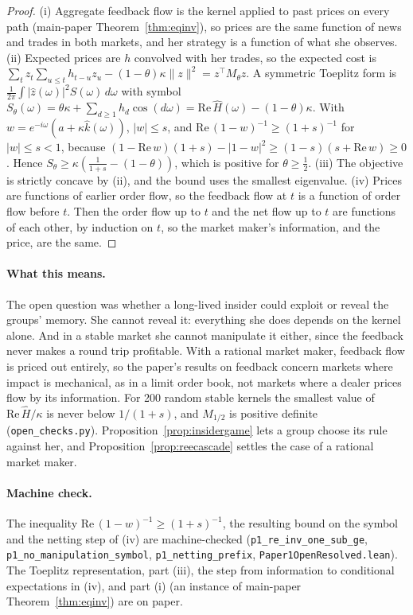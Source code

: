 \documentclass[12pt]{article}
\theoremstyle{definition}
\theoremstyle{remark}
\begin{document}
\begin{proof}
(i) Aggregate feedback flow is the kernel applied to past prices on every path (main-paper Theorem~\ref{thm:eqinv}), so prices are the same function of news and trades in both markets, and her strategy is a function of what she observes. (ii) Expected prices are $h$ convolved with her trades, so the expected cost is $\sum_tz_t\sum_{u\le t}h_{t-u}z_u-(1-\theta)\kappa\|z\|^2=z^\top M_\theta z$. A symmetric Toeplitz form is $\frac1{2\pi}\int|\hat z(\omega)|^2S(\omega)\,d\omega$ with symbol $S_\theta(\omega)=\theta\kappa+\sum_{d\ge1}h_d\cos(d\omega)=\mathrm{Re}\,\hat H(\omega)-(1-\theta)\kappa$. With $w=e^{-i\omega}(a+\kappa\hat k(\omega))$, $|w|\le s$, and $\mathrm{Re}\,(1-w)^{-1}\ge(1+s)^{-1}$ for $|w|\le s<1$, because $(1-\mathrm{Re}\,w)(1+s)-|1-w|^2\ge(1-s)(s+\mathrm{Re}\,w)\ge0$. Hence $S_\theta\ge\kappa(\frac1{1+s}-(1-\theta))$, which is positive for $\theta\ge\frac12$. (iii) The objective is strictly concave by (ii), and the bound uses the smallest eigenvalue. (iv) Prices are functions of earlier order flow, so the feedback flow at $t$ is a function of order flow before $t$. Then the order flow up to $t$ and the net flow up to $t$ are functions of each other, by induction on $t$, so the market maker's information, and the price, are the same.
\end{proof}

\paragraph{What this means.} The open question was whether a long-lived insider could exploit or reveal the groups' memory. She cannot reveal it: everything she does depends on the kernel alone. And in a stable market she cannot manipulate it either, since the feedback never makes a round trip profitable. With a rational market maker, feedback flow is priced out entirely, so the paper's results on feedback concern markets where impact is mechanical, as in a limit order book, not markets where a dealer prices flow by its information. For 200 random stable kernels the smallest value of $\mathrm{Re}\,\hat H/\kappa$ is never below $1/(1+s)$, and $M_{1/2}$ is positive definite (\nolinkurl{open_checks.py}). Proposition~\ref{prop:insidergame} lets a group choose its rule against her, and Proposition~\ref{prop:reecascade} settles the case of a rational market maker.

\paragraph{Machine check.} The inequality $\mathrm{Re}\,(1-w)^{-1}\ge(1+s)^{-1}$, the resulting bound on the symbol and the netting step of (iv) are machine-checked (\texttt{p1\_re\_inv\_one\_sub\_ge}, \texttt{p1\_no\_manipulation\_symbol}, \texttt{p1\_netting\_prefix}, \nolinkurl{Paper1OpenResolved.lean}). The Toeplitz representation, part (iii), the step from information to conditional expectations in (iv), and part (i) (an instance of main-paper Theorem~\ref{thm:eqinv}) are on paper.
\end{document}
